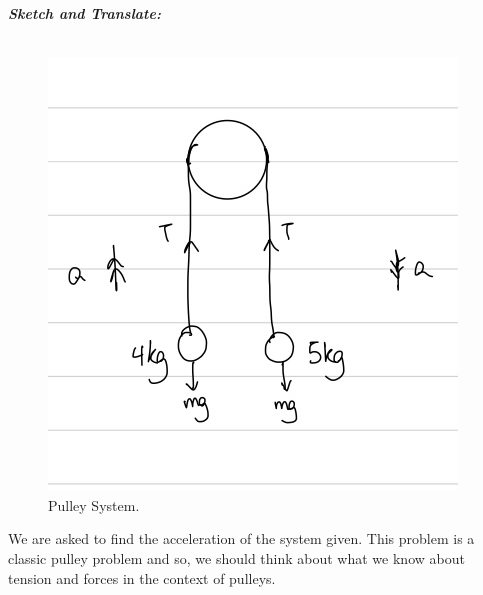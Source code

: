 \begin{subquestions}
\begin{subsubquestions}
	\textbf{\textit{Sketch and Translate:}} \\ \\
	\begin{figure}[H]
		\begin{center}
			\includegraphics[scale=0.25]{../2011/figures/2011q5-2}
			\caption{\label{2011:q5:Sketch2} Pulley System.}
		\end{center}
	\end{figure}	
	We are asked to find the acceleration of the system given. This problem is a classic pulley problem and so, we should think about what we know about tension and forces in the context of pulleys.
	
	
	

\end{subsubquestions}
\end{subquestions}
